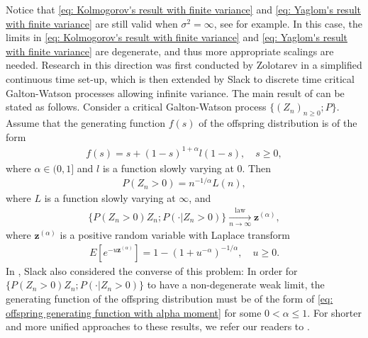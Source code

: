 \documentclass[12pt,a4paper]{amsart}
\theoremstyle{definition}
\numberwithin{equation}{section}
\begin{document}
Notice that \eqref{eq: Kolmogorov's result with finite variance} and \eqref{eq: Yaglom's result with finite variance} are still valid when  $\sigma^2 = \infty$,
see \cite{KestenNeySpitzer1966The-Galton-Watson} for example.
In this case, the limits in \eqref{eq: Kolmogorov's result with finite variance} and \eqref{eq: Yaglom's result with finite variance} are degenerate, and thus more appropriate scalings are needed.
Research in this direction was first conducted by Zolotarev \cite{Zolotarev1957More} in a simplified continuous time set-up, which is then extended by Slack \cite{Slack1968A-branching} to discrete time critical Galton-Watson processes allowing infinite variance.
The main result of  \cite{Slack1968A-branching} can be stated as follows. 
Consider a critical Galton-Watson process $\{(Z_n)_{n\geq 0}; P\}$.
Assume that the  generating function $f(s)$ of the offspring distribution is of the form
\begin{align}\label{eq: offspring generating function with alpha moment}
	f(s)
	= s + (1-s)^{1+ \alpha} l(1-s),
	\quad s\geq 0,
\end{align}
where $\alpha\in (0, 1]$ and $l$ is a function slowly varying at $0$.
Then
\begin{align} \label{eq: extinction probability of critical GW process without 2rd moment}
	P(Z_n > 0)
	= n^{-1/\alpha} L(n),
\end{align}
where $L$ is a function slowly varying at $\infty$, and
\begin{align} \label{eq: conditional distribution of critical GW process without 2rd moment}
	\big\{ P(Z_n > 0) Z_n; P(\cdot | Z_n > 0)\big\}
	\xrightarrow[n\to \infty]{\operatorname{law}} \mathbf z^{(\alpha)},
\end{align}
where $\mathbf z^{(\alpha)}$ is a positive random variable with Laplace transform
\begin{align}\label{e:zloltarev}
	E[e^{- u \mathbf z^{(\alpha)}}]
	= 1 - (1+ u^{-\alpha})^{-1/\alpha},
	\quad u \geq 0.
\end{align}
In \cite{Slack1972Further}, Slack also considered the converse of this problem:
In order for $\big\{ P(Z_n > 0) Z_n; P(\cdot | Z_n > 0)\big\}$ to have a non-degenerate weak limit,
the generating function of the offspring distribution must be of the form of \eqref{eq: offspring generating function with alpha moment} for some $0 < \alpha \leq 1$.
For shorter and more unified approaches to these results, we refer our readers to \cite{Borovkov1989Method, Pakes2010Critical}.
\end{document}
